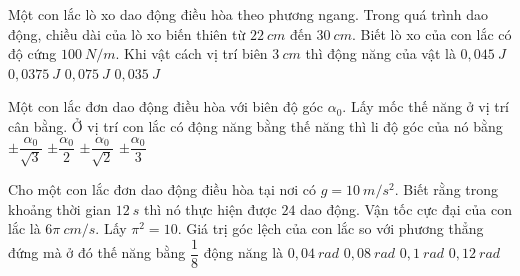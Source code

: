 	
	\begin{ex}%
		Một con lắc lò xo dao động điều hòa theo phương ngang. Trong quá trình dao động, chiều dài của lò xo biến thiên từ $22\ cm$ đến $30\ cm$. Biết lò xo của con lắc có độ cứng $100\ N/m$. Khi vật cách vị trí biên $3\ cm$ thì động năng của vật là
		\choice
		{$0,045\ J$}
		{$0,0375\ J$}
		{\True $0,075\ J$}
		{$0,035\ J$}
	\end{ex}
	\begin{ex} %
		Một con lắc đơn dao động điều hòa với biên độ góc $\alpha_0$. Lấy mốc thế năng ở vị trí cân bằng. Ở vị trí con lắc có động năng bằng thế năng thì li độ góc của nó bằng
		\choice
		{$\pm \dfrac{\alpha _0}{\sqrt{3}}$}
		{$\pm \dfrac{\alpha _0}{2}$}
		{\True $\pm \dfrac{\alpha _0}{\sqrt{2}}$}
		{$\pm \dfrac{\alpha _0}{3}$}
	\end{ex}
	\begin{ex} %
		Cho một con lắc đơn dao động điều hòa tại nơi có $g = 10\ m/s^2$. Biết rằng trong khoảng thời gian $12\ s$ thì nó thực hiện được $24$ dao động. Vận tốc cực đại của con lắc là $6\pi\ cm/s$. Lấy $\pi^2 = 10$. Giá trị góc lệch của con lắc so với phương thẳng đứng mà ở đó thế năng bằng $\dfrac{1}{8}$ động năng là
		\choice
		{$0,04\ rad$}
		{\True $0,08\ rad$}
		{$0,1\ rad$}
		{$0,12\ rad$}
	\end{ex}
	

